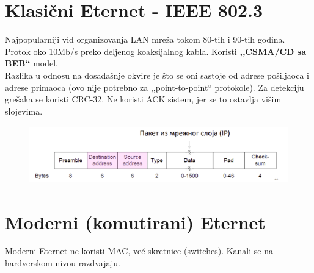 \documentclass[a4paper]{article}
\begin{document}
\section{Klasični Eternet - IEEE 802.3}
    Najpopularniji vid organizovanja LAN mreža tokom 80-tih i 90-tih godina. Protok oko 10Mb/s
    preko deljenog koaksijalnog kabla. Koristi \textbf{,,CSMA/CD sa BEB``} model. \\

    Razlika u odnosu na dosadašnje okvire je što se oni sastoje od adrese pošiljaoca i
    adrese primaoca (ovo nije potrebno za ,,point-to-point`` protokole). Za detekciju 
    grešaka se koristi CRC-32. Ne koristi ACK sistem, jer se to ostavlja višim slojevima.
    \begin{figure}[H]
        \begin{center}
            \includegraphics[width=120mm,height=25mm]{Slike/eternet1.png}
        \end{center}
    \end{figure}
    
\section{Moderni (komutirani) Eternet}
    Moderni Eternet ne koristi MAC, već skretnice (switches). Kanali se na hardverskom 
    nivou razdvajaju. 
\end{document}
